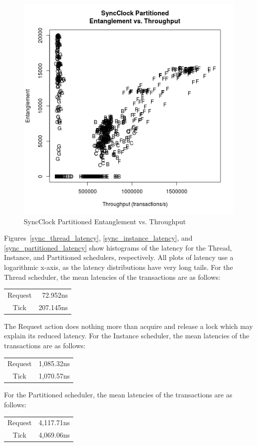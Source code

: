 \begin{figure}
\center
\includegraphics[height=.4\textheight]{sync_partitioned_throughput_entanglement.png}
\caption{SyncClock Partitioned Entanglement vs. Throughput}
\label{sync_partitioned_throughput_entanglement}
\end{figure}

Figures~\ref{sync_thread_latency}, \ref{sync_instance_latency}, and \ref{sync_partitioned_latency} show histograms of the latency for the Thread, Instance, and Partitioned schedulers, respectively.
All plots of latency use a logarithmic x-axis, as the latency distributions have very long tails.
For the Thread scheduler, the mean latencies of the transactions are as follows:
\begin{center}
\begin{tabular}{cr}
Request &  72.952ns \\
Tick    & 207.145ns \\
\end{tabular}
\end{center}
The Request action does nothing more than acquire and release a lock which may explain its reduced latency.
For the Instance scheduler, the mean latencies of the transactions are as follows:
\begin{center}
\begin{tabular}{cr}
Request & 1,085.32ns \\
Tick    & 1,070.57ns \\
\end{tabular}
\end{center}
For the Partitioned scheduler, the mean latencies of the transactions are as follows:
\begin{center}
\begin{tabular}{cr}
Request & 4,117.71ns \\
Tick    & 4,069.06ns \\
\end{tabular}
\end{center}

